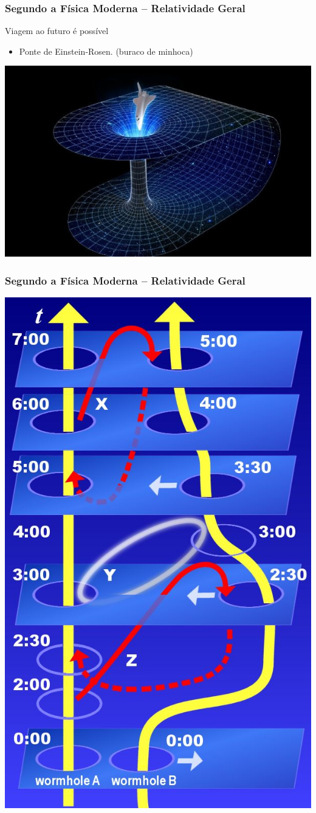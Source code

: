 \begin{frame}
    \frametitle{Segundo a Física Moderna -- Relatividade Geral}
    
    \begin{block}{Viagem ao futuro é possível}
        \begin{itemize}
            \item Ponte de Einstein-Rosen. (buraco de minhoca)
        \end{itemize}
    \end{block}

    \centering
    \includegraphics[height=0.6\textwidth]{img/wormhole.jpg}
    
\end{frame}

\begin{frame}
    \frametitle{Segundo a Física Moderna -- Relatividade Geral}
    
    \centering
    \includegraphics[height=0.75\textwidth]{img/wormhole_timetravel.jpg}
    
\end{frame}

